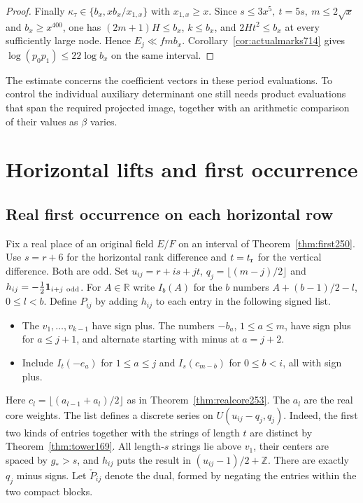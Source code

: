 \documentclass[a4paper,11pt]{article}
\theoremstyle{definition}
\theoremstyle{remark}
\newcommand{\RR}{\mathbb R}\newcommand{\CC}{\mathbb C}\newcommand{\QQ}{\mathbb Q}
\newcommand{\ZZ}{\mathbb Z}\newcommand{\ord}{\operatorname{ord}}
\numberwithin{equation}{section}
\begin{document}
\begin{proof}
Finally \(\kappa_\tau\in\{b_x,xb_x/x_{1,x}\}\) with
\(x_{1,x}\ge x\). Since \(s\le3x^5,\ t=5s,\ m\le2\sqrt x\)
and \(b_x\ge x^{400}\), one has \((2m+1)H\le b_x\),
\(k\le b_x\), and \(2Ht^2\le b_x\) at every sufficiently
large node. Hence \(E_j\ll f m b_x\).
Corollary~\ref{cor:actualmarks714} gives
\(\log(p_0p_1)\le22\log b_x\) on the same interval.
\end{proof}

The estimate concerns the coefficient vectors in these
period evaluations. To control the individual auxiliary
determinant one still needs product evaluations that span
the required projected image, together with an arithmetic
comparison of their values as \(\beta\) varies.
\clearpage

\section{Horizontal lifts and first occurrence}\label{nav:g-VI-3}

\subsection{Real first occurrence on each horizontal row}\label{nav:V-36}
Fix a real place of an original field \(E/F\) on an interval of
Theorem~\ref{thm:first250}. Use \(s=r+6\) for the horizontal rank
difference and \(t=t_{\rm r}\) for the vertical difference. Both
are odd. Set \(u_{ij}=r+is+jt\), \(q_j=\lfloor(m-j)/2\rfloor\) and
\(h_{ij}=-\tfrac12\mathbf1_{i+j\ {\rm odd}}\).
For \(A\in\RR\) write \(I_b(A)\) for the \(b\) numbers
\(A+(b-1)/2-l\), \(0\le l<b\). Define \(P_{ij}\) by adding
\(h_{ij}\) to each entry in the following signed list.
\begin{itemize}
\item The \(v_1,\ldots,v_{k-1}\) have sign plus. The numbers
\(-b_a\), \(1\le a\le m\), have sign plus for \(a\le j+1\),
and alternate starting with minus at \(a=j+2\).
\item Include \(I_t(-e_a)\) for \(1\le a\le j\) and
\(I_s(c_{m-b})\) for \(0\le b<i\), all with sign plus.
\end{itemize}
Here \(c_l=\lfloor(a_{l-1}+a_l)/2\rfloor\) as in
Theorem~\ref{thm:realcore253}. The \(a_l\) are the real core weights. The list defines a discrete
series on \(U(u_{ij}-q_j,q_j)\). Indeed, the first two kinds of
entries together with the strings of length \(t\) are distinct by
Theorem~\ref{thm:tower169}. All length-\(s\) strings lie above
\(v_1\), their centers are spaced by \(g_*>s\), and \(h_{ij}\)
puts the result in \((u_{ij}-1)/2+\ZZ\). There are exactly
\(q_j\) minus signs. Let \(\check P_{ij}\) denote the dual, formed
by negating the entries within the two compact blocks.
\end{document}
